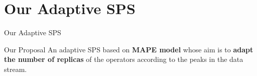 \section[3]{Our Adaptive SPS}

\begin{frame}{Our Adaptive SPS}
	\begin{exampleblock}{Our Proposal}
		An adaptive SPS based on \textbf{MAPE model} whose aim is to \textbf{adapt the number of replicas} of the operators according to the peaks in the data stream.
	\end{exampleblock}
	
	

\end{frame}
